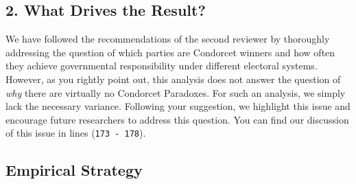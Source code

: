 \documentclass[a4paper, 12pt]{scrartcl}
\begin{document}
\subsection*{2. What Drives the Result?}
We have followed the recommendations of the second reviewer by thoroughly addressing the question of which parties are Condorcet winners and how often they achieve governmental responsibility under different electoral systems. However, as you rightly point out, this analysis does not answer the question of \textit{why} there are virtually no Condorcet Paradoxes. For such an analysis, we simply lack the necessary variance. Following your suggestion, we highlight this issue and encourage future researchers to address this question. You can find our discussion of this issue in lines (\texttt{173 - 178}).

\subsection*{Empirical Strategy}
\end{document}
